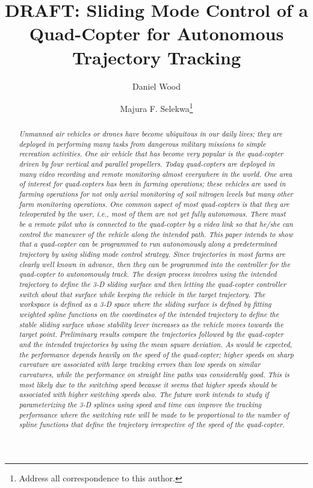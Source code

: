 \documentclass[twocolumn,10pt]{asme2e}
\title{DRAFT: Sliding Mode Control of a Quad-Copter for Autonomous Trajectory Tracking }
\author{Daniel Wood
	\affiliation{Mechatronics and Robotics Laboratory\\
		Department of Mechanical aEngineering\\
		North Dakota State University\\
		Fargo, ND 58102\\
		Email: daniel.wood@ndsu.edu
	}	
}
\author{Majura F. Selekwa\thanks{Address all correspondence to this author.} 
	\affiliation{Mechatronics and Robotics Laboratory\\
		Department of Mechanical aEngineering\\
		North Dakota State University\\
		Fargo, ND 58102\\
		Email: majura.selekwa@ndsu.edu
	}
}
\begin{document}
\maketitle
\begin{abstract}
	{\it  Unmanned air vehicles or drones have become ubiquitous in our daily lives; they are deployed in performing many tasks from dangerous military missions to simple recreation activities. One air vehicle that has become very popular is the quad-copter driven by four vertical and parallel propellers. Today quad-copters are deployed in many video recording and remote monitoring almost everywhere in the world. One area of interest for quad-copters has been in farming operations; these vehicles are used in farming operations for not only aerial monitoring of soil nitrogen levels but many other farm monitoring operations. One common aspect of most quad-copters is that they are teleoperated by the user, i.e., most of them are not yet fully autonomous. There must be a remote pilot who is connected to the quad-copter by a video link so that he/she can control the maneuver of the vehicle along the intended path. This paper intends to show that a quad-copter can be programmed to run autonomously along a predetermined trajectory by using sliding mode control strategy. Since trajectories in most farms are clearly well known in advance, then they can be programmed into the controller for the quad-copter to autonomously track. The design process involves using the intended trajectory to define the 3-D sliding surface and then letting the quad-copter controller switch about that surface while keeping the vehicle in the target trajectory. The workspace is defined as a 3-D space where the sliding surface is defined by fitting weighted spline functions on the coordinates of the intended trajectory to define the stable sliding surface whose stability lever increases as the vehicle moves towards the target point. Preliminary results compare the trajectories followed by the quad-copter and the intended trajectories by using the mean square deviation. As would be expected, the performance depends heavily on the speed of the quad-copter; higher speeds on sharp curvature are associated with large tracking errors than low speeds on similar curvatures, while the performance on straight line paths was considerably good. This is  most likely due to the switching speed because it seems that higher speeds should be associated with higher switching speeds also. The future work intends to study if parameterizing the 3-D splines using speed and time can improve the tracking performance where the switching rate will be made to be proportional to the number of spline functions that define the trajectory irrespective of the speed of the quad-copter.
	}\end{abstract}
\end{document}
